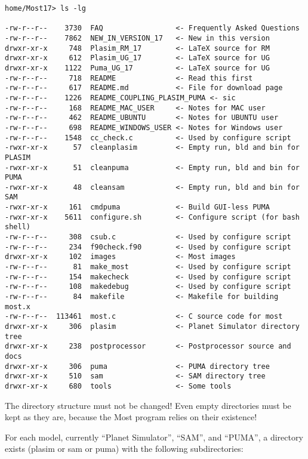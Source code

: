 \begin{verbatim}
home/Most17> ls -lg

-rw-r--r--    3730  FAQ                 <- Frequently Asked Questions
-rw-r--r--    7862  NEW_IN_VERSION_17   <- New in this version
drwxr-xr-x     748  Plasim_RM_17        <- LaTeX source for RM
drwxr-xr-x     612  Plasim_UG_17        <- LaTeX source for UG
drwxr-xr-x    1122  Puma_UG_17          <- LaTeX source for UG
-rw-r--r--     718  README              <- Read this first
-rw-r--r--     617  README.md           <- File for download page
-rw-r--r--    1226  README_COUPLING_PLASIM_PUMA <- sic
-rw-r--r--     168  README_MAC_USER     <- Notes for MAC user
-rw-r--r--     462  README_UBUNTU       <- Notes for UBUNTU user
-rw-r--r--     698  README_WINDOWS_USER <- Notes for Windows user
-rw-r--r--    1548  cc_check.c          <- Used by configure script
-rwxr-xr-x      57  cleanplasim         <- Empty run, bld and bin for PLASIM
-rwxr-xr-x      51  cleanpuma           <- Empty run, bld and bin for PUMA
-rwxr-xr-x      48  cleansam            <- Empty run, bld and bin for SAM
-rwxr-xr-x     161  cmdpuma             <- Build GUI-less PUMA
-rwxr-xr-x    5611  configure.sh        <- Configure script (for bash shell)
-rw-r--r--     308  csub.c              <- Used by configure script
-rw-r--r--     234  f90check.f90        <- Used by configure script
drwxr-xr-x     102  images              <- Most images
-rw-r--r--      81  make_most           <- Used by configure script
-rw-r--r--     154  makecheck           <- Used by configure script
-rw-r--r--     108  makedebug           <- Used by configure script
-rw-r--r--      84  makefile            <- Makefile for building most.x
-rw-r--r--  113461  most.c              <- C source code for most
drwxr-xr-x     306  plasim              <- Planet Simulator directory tree
drwxr-xr-x     238  postprocessor       <- Postprocessor source and docs
drwxr-xr-x     306  puma                <- PUMA directory tree
drwxr-xr-x     510  sam                 <- SAM directory tree
drwxr-xr-x     680  tools               <- Some tools

\end{verbatim}

The directory structure must not be changed! Even empty directories must be
kept as they are, because the Most program relies on their existence!

For each model, currently ``Planet Simulator'', ``SAM'', and ``PUMA'', a directory exists
(plasim or sam or puma) with the following subdirectories:

